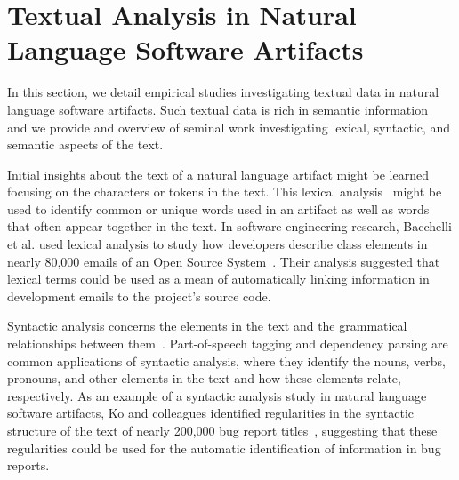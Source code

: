 



\section{Textual Analysis in Natural Language Software Artifacts}
\label{cp2:text-in-se}



In this section, we detail empirical studies investigating 
textual data in natural language software artifacts. 
Such textual data is  rich in semantic information~\cite{dekhtyar2004} 
and we provide and overview of seminal work 
investigating lexical, syntactic, and semantic aspects of the text.




Initial insights about the text of a natural language artifact might be learned focusing on 
the characters or tokens in the text.
This lexical analysis~\cite{jurafsky2014speech} might be used to identify common or unique words 
used in an artifact as well as words that often appear together in the text.
In software engineering research, Bacchelli et al. used lexical analysis to study how developers describe class elements
in nearly 80,000 emails of an Open Source System~\cite{bacchelli2009}.
Their analysis suggested that lexical terms could be 
used as a mean of automatically linking information in development emails to 
the project's source code.







Syntactic analysis concerns the  elements in the text 
and the grammatical relationships between them~\cite{jurafsky2014speech}. 
Part-of-speech tagging and dependency parsing are common applications of syntactic analysis,
where they identify the nouns, verbs, pronouns, and other elements in the text 
and how these elements relate, respectively. 
As an example of a syntactic analysis study in natural language software artifacts, 
Ko and colleagues identified regularities in the syntactic structure of the text 
of nearly 200,000 bug report titles~\cite{Ko2006}, suggesting that these 
regularities could be used for the automatic identification 
of information in bug reports. 






